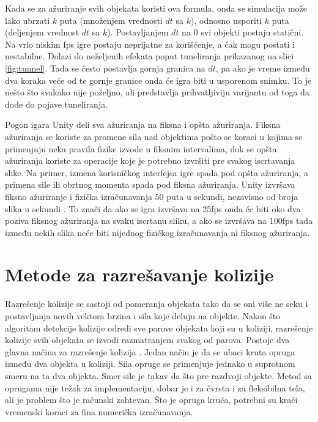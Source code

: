 \documentclass[12pt,oneside]{memoir}
\begin{document}
Kada se za ažuriranje svih objekata koristi ova formula, onda se simulacija može lako ubrzati $k$ puta
(množenjem vrednosti $dt$ sa $k$), odnosno usporiti $k$ puta (deljenjem vrednost $dt$ sa $k$).
Postavljanjem $dt$ na 0 svi objekti postaju statični. 
Na vrlo niskim fps igre postaju neprijatne za korišćenje, a čak mogu postati i nestabilne.
Dolazi do neželjenih efekata poput tuneliranja prikazanog na slici \ref{fig:tunnel}.
Tada se često postavlja gornja granica na $dt$, pa 
ako je vreme između dva koraka veće od te gornje granice onda će igra biti u usporenom snimku.
To je nešto što svakako nije poželjno, ali predstavlja prihvatljiviju varijantu od toga da dođe do pojave tuneliranja.

Pogon igara Unity \cite{unity} deli sva ažuriranja na fiksna i opšta ažuriranja. 
Fiksna ažuriranja se koriste za promene sila nad objektima 
pošto se koraci u kojima se primenjuju neka pravila fizike izvode u fiksnim intervalima, 
dok se opšta ažuriranja koriste za operacije koje je potrebno izvršiti pre svakog iscrtavanja slike. 
Na primer, izmena korisničkog interfejsa igre spada pod opšta ažuriranja, a primena sile ili obrtnog momenta spada pod fiksna ažuriranja.
Unity izvršava fiksno ažuriranje i fizička izračunavanja 50 puta u sekundi, nezavisno od broja slika u sekundi \cite{unity}.
To znači da ako se igra izvršava na 25fps onda će biti oko dva poziva fiksnog ažuriranja na svaku iscrtanu sliku,
a ako se izvršava na 100fps tada između nekih slika neće biti nijednog fizičkog izračunavanja ni fiksnog ažuriranja.

\section{Metode za razrešavanje kolizije}
\label{sec:razresenje}

Razrešenje kolizije se sastoji od
pomeranja objekata tako da se oni više ne seku i postavljanja novih vektora brzina i sila koje deluju na objekte.
Nakon što algoritam detekcije kolizije odredi sve parove objekata koji su u koliziji, 
razrešenje kolizije svih objekata se izvodi razmatranjem svakog od parova.
Postoje dva glavna načina za razrešenje kolizija \cite{Moore}.
Jedan način je da se ubaci kruta opruga između dva objekta u koliziji.
Sila opruge se primenjuje jednako u suprotnom smeru na ta dva objekta.
Smer sile je takav da što pre razdvoji objekte. Metod sa oprugama nije težak 
za implementaciju, dobar je i za čvrsta i za fleksibilna tela, ali je problem što je računski zahtevan. 
Što je opruga kruća, potrebni su kraći vremenski koraci za fina numerička izračunavanja.
\end{document}

